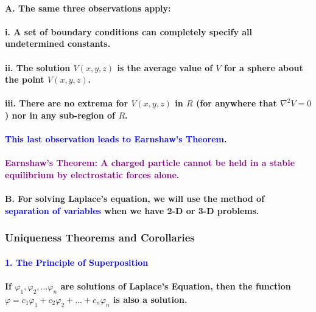 \documentclass{article}
\begin{document}
\paragraph{\indent A. The same three observations apply:}
\paragraph{\indent i. A set of boundary conditions can completely specify all undetermined constants.}
\paragraph{\indent ii. The solution $V(x,y,z)$ is the average value of $V$ for a sphere about the point $V(x,y,z)$.}
\paragraph{\indent iii. There are no extrema for $V(x,y,z)$ in $R$ (for anywhere that $\nabla^2V=0$) nor in any sub-region of $R$.}
\paragraph{\indent \textcolor{blue}{This last observation leads to Earnshaw's Theorem}.}
\paragraph{\indent \textcolor{purple}{Earnshaw's Theorem: A charged particle cannot be held in a stable equilibrium by electrostatic forces alone.}}
\paragraph{\indent B. For solving Laplace's equation, we will use the method of \textcolor{blue}{separation of variables} when we have 2-D or 3-D problems.}
\subsubsection{Uniqueness Theorems and Corollaries}
\paragraph{\textcolor{blue}{1. The Principle of Superposition}}
\paragraph{\indent If $\varphi_1,\varphi_2,\dots \varphi_n$ are solutions of Laplace's Equation, then the function $\varphi=c_1\varphi_1+c_2\varphi_2+\dots +c_n\varphi_n$ is also a solution.}
\end{document}
